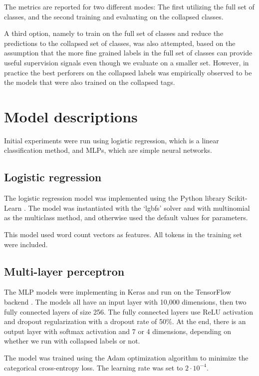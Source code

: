 The metrics are reported for two different modes: The first utilizing the
full set of classes, and the second training and evaluating on the collapsed
classes.

A third option, namely to train on the full set of classes and reduce the
predictions to the collapsed set of classes, was also attempted, based on the
assumption that the more fine grained labels in the full set of classes can
provide useful supervision signals even though we evaluate on a smaller set.
However, in practice the best perforers on the collapsed labels was
empirically observed to be the models that were also trained on the collapsed
tags.


\section{Model descriptions}

Initial experiments were run using logistic regression, which is a linear
classification method, and \acp{MLP}, which are simple neural networks.


\subsection{Logistic regression}

The logistic regression model was implemented using the Python library
Scikit-Learn \autocite{scikit-learn}. The model was instantiated with the
`lgbfs' solver and with multinomial as the multiclass method, and otherwise
used the default values for parameters.

This model used word count vectors as features. All tokens in the training set
were included.


\subsection{Multi-layer perceptron}
\label{subsec:mlp}

The MLP models were implementing in Keras \autocite{keras} and run on the
TensorFlow backend \autocite{tensorflow}. The models all have an input layer
with 10,000 dimensions, then two fully connected layers of size 256. The
fully connected layers use \ac{ReLU} activation and dropout regularization
with a dropout rate of 50\%. At the end, there is an output layer with
softmax activation and 7 or 4 dimensions, depending on whether we run with
collapsed labels or not.

The model was trained using the Adam optimization algorithm to minimize the
categorical cross-entropy loss. The learning rate was set to $2\cdot
10^{-4}$.

